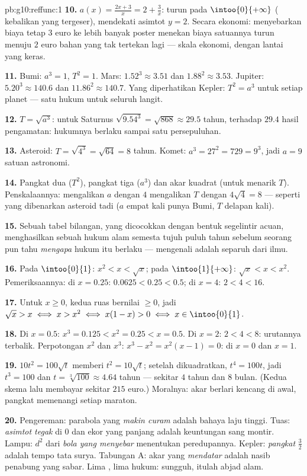 \begin{solution}{pb:g10:reffunc:1}
\textbf{10.} $a(x) = \frac{2x + 3}{x} = 2 + \frac3x$:
turun pada $\intoo{0}{+\infty}$ ( kebalikan yang tergeser),
mendekati asimtot $y = 2$. Secara ekonomi: menyebarkan biaya
tetap $3$ euro ke lebih banyak poster menekan biaya satuannya turun
menuju $2$ euro bahan yang tak tertekan lagi --- skala ekonomi,
dengan lantai yang keras.

\textbf{11.} Bumi: $a^3 = 1$, $T^2 = 1$. Mars:
$1.52^3 \approx 3.51$ dan $1.88^2 \approx 3.53$. Jupiter:
$5.20^3 \approx 140.6$ dan $11.86^2 \approx 140.7$. Yang diperhatikan
Kepler: $T^2 = a^3$ untuk setiap planet --- satu hukum untuk seluruh
langit.

\textbf{12.} $T = \sqrt{a^3}$: untuk Saturnus
$\sqrt{9.54^3} = \sqrt{868} \approx 29.5$ tahun, terhadap
$29.4$ hasil pengamatan: hukumnya berlaku sampai satu persepuluhan.

\textbf{13.} Asteroid: $T = \sqrt{4^3} = \sqrt{64} = 8$ tahun.
Komet: $a^3 = 27^2 = 729 = 9^3$, jadi $a = 9$ satuan astronomi.

\textbf{14.} Pangkat dua ($T^2$), pangkat tiga ($a^3$) dan akar kuadrat
(untuk menarik $T$). Penskalaannya: mengalikan $a$ dengan $4$ mengalikan
$T$ dengan $4\sqrt4 = 8$ --- seperti yang dibenarkan asteroid tadi ($a$
empat kali punya Bumi, $T$ delapan kali).

\textbf{15.} Sebuah tabel bilangan, yang dicocokkan dengan bentuk
segelintir  acuan, menghasilkan sebuah hukum alam semesta
tujuh puluh tahun sebelum seorang pun tahu \emph{mengapa} hukum itu
berlaku --- mengenali  adalah separuh dari ilmu.

\textbf{16.} Pada $\intoo{0}{1}$: $x^2 < x < \sqrt x$; pada
$\intoo{1}{+\infty}$: $\sqrt x < x < x^2$. Pemeriksaannya: di
$x = 0.25$: $0.0625 < 0.25 < 0.5$; di $x = 4$:
$2 < 4 < 16$.

\textbf{17.} Untuk $x \geq 0$, kedua ruas bernilai $\geq 0$, jadi
$\sqrt x > x \iff x > x^2 \iff x(1 - x) > 0 \iff
x \in \intoo{0}{1}$.

\textbf{18.} Di $x = 0.5$: $x^3 = 0.125 < x^2 = 0.25 < x =
0.5$. Di $x = 2$: $2 < 4 < 8$: urutannya terbalik. Perpotongan
$x^2$ dan $x^3$: $x^3 - x^2 = x^2(x - 1) = 0$: di $x = 0$ dan
$x = 1$.

\textbf{19.} $10t^2 = 100\sqrt t$ memberi $t^2 = 10\sqrt t$;
setelah dikuadratkan, $t^4 = 100t$, jadi $t^3 = 100$ dan
$t = \sqrt[3]{100} \approx 4.64$ tahun --- sekitar $4$ tahun dan
$8$ bulan. (Kedua skema lalu membayar sekitar $215$ euro.) Moralnya:
akar berlari kencang di awal, pangkat memenangi setiap maraton.

\textbf{20.} Pengereman: parabola yang \emph{makin curam} adalah
bahaya laju tinggi. Tuas: \emph{asimtot tegak} di $0$
dan ekor yang panjang adalah keuntungan sang montir. Lampu:
$d^2$ dari \emph{bola yang menyebar} menentukan peredupannya. Kepler:
\emph{pangkat} $\frac32$ adalah tempo tata surya.
Tabungan A: akar yang \emph{mendatar} adalah nasib penabung yang sabar.
Lima , lima hukum: sungguh, itulah abjad alam.

\end{solution}
